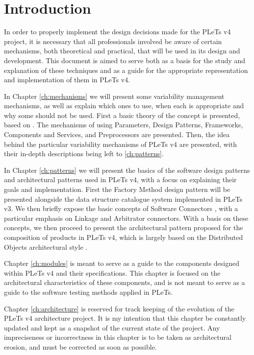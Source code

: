 \chapter*{Introduction}

In order to properly implement the design decisions made for the PLeTs v4 project, it is necessary that all professionals involved be aware of certain mechanisms, both theoretical and practical, that will be used in its design and development. This document is aimed to serve both as a basis for the study and explanation of these techniques and as a guide for the appropriate representation and implementation of them in PLeTs v4.

In Chapter \ref{ch:mechanisms} we will present some variability management mechanisms, as well as explain which ones to use, when each is appropriate and why some should not be used. First a basic theory of the concept is presented, based on \cite{APEL:2013}. The mechanisms of using Parameters, Design Patterns, Frameworks, Components and Services, and Preprocessors are presented. Then, the idea behind the particular variability mechanisms of PLeTs v4 are presented, with their in-depth descriptions being left to \ref{ch:patterns}.

In Chapter \ref{ch:patterns} we will present the basics of the software design patterns and architectural patterns used in PLeTs v4, with a focus on explaining their goals and implementation. First the Factory Method design pattern will be presented \cite{LASER:2015} alongside the data structure catalogue system implemented in PLeTs v3. We then briefly expose the basic concepts of Software Connectors \cite{TAYLOR:2009}, with a particular emphasis on Linkage and Arbitrator connectors. With a basis on these concepts, we then proceed to present the architectural pattern proposed for the composition of products in PLeTs v4, which is largely based on the Distributed Objects architectural style \cite{CORBA:2012}.

Chapter \ref{ch:modules} is meant to serve as a guide to the components designed within PLeTs v4 and their specifications. This chapter is focused on the architectural characteristics of these components, and is not meant to serve as a guide to the software testing methods applied in PLeTs.

Chapter \ref{ch:architecture} is reserved for track keeping of the evolution of the PLeTs v4 architecture project. It is my intention that this chapter be constantly updated and kept as a snapshot of the current state of the project. Any impreciseness or incorrectness in this chapter is to be taken as architectural erosion, and must be corrected as soon as possible.

